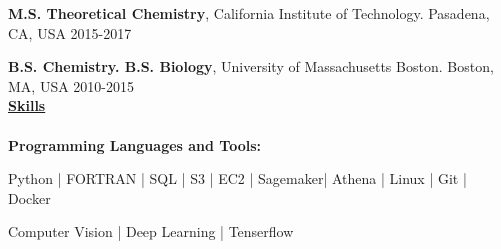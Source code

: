 \documentclass[letterpaper]{article}
\begin{document}
\textbf{M.S. Theoretical Chemistry}, California Institute of Technology.
Pasadena, CA, USA  \hfill 2015-2017 \\
\vspace{-0.1in}

\textbf{B.S. Chemistry. B.S. Biology}, University of
Massachusetts Boston.
Boston, MA, USA  \hfill 2010-2015 \\

\vspace{0.15in}
{\large \textbf{\underline{Skills}}}\\
\vspace{-0.2in}\\

\textbf{Programming Languages and Tools:}

Python | FORTRAN | SQL | S3 | EC2 | Sagemaker| Athena | Linux | Git | Docker

Computer Vision | Deep Learning | Tenserflow
\end{document}

